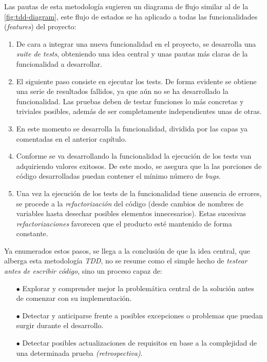 Las pautas de esta metodología sugieren un diagrama de flujo similar al de la \autoref{fig:tdd-diagram},
este flujo de estados se ha aplicado a todas las funcionalidades (\textit{features}) del
proyecto:

\begin{enumerate}
    \item De cara a integrar una nueva funcionalidad en el proyecto, se desarrolla una
    \textit{suite de tests}, obteniendo una idea central y unas pautas más claras de la funcionalidad a desarrollar.
    \item El siguiente paso consiste en ejecutar los tests. De forma evidente se obtiene 
    una serie de resultados fallidos, ya que aún no se ha desarrollado la funcionalidad.
    Las pruebas deben de testar funciones lo más concretas y triviales posibles, además de ser
    completamente independientes unas de otras.
    \item En este momento se desarrolla la funcionalidad, dividida por las capas
    ya comentadas en el anterior capítulo.
    \item Conforme se va desarrollando la funcionalidad la ejecución de los tests
    van adquiriendo valores exitosos. De este modo, se asegura que la las porciones de código desarrolladas
    puedan contener el mínimo número de \textit{bugs}.
    \item Una vez la ejecución de los tests de la funcionalidad tiene ausencia de errores, 
    se procede a la \textit{refactorización} del código (desde cambios de nombres de variables
    hasta desechar posibles elementos innecesarios). Estas sucesivas \textit{refactorizaciones}
    favorecen que el producto esté mantenido de forma constante.
 \end{enumerate}

 Ya enumerados estos pasos, se llega a la conclusión de que la idea central, que alberga esta 
 metodología \textit{TDD}, no se resume como el simple hecho de \textit{testear antes de escribir código}, sino un
 proceso capaz de:

 \begin{itemize}
     \item[$\bullet$] Explorar y comprender mejor la problemática central de la solución antes de comenzar con
     su implementación.
     \item[$\bullet$] Detectar y anticiparse frente a  posibles excepciones o problemas que
     puedan surgir durante el desarrollo.
     \item[$\bullet$] Detectar posibles actualizaciones de requisitos en base a la complejidad
     de una determinada prueba \textit{(retrospectiva)}.
 \end{itemize}

